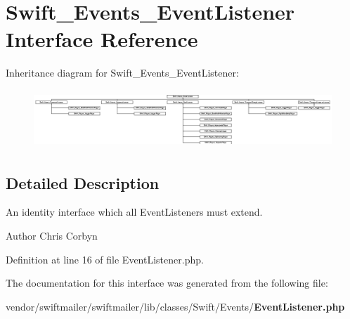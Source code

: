 \section{Swift\+\_\+\+Events\+\_\+\+Event\+Listener Interface Reference}
\label{interface_swift___events___event_listener}
Inheritance diagram for Swift\+\_\+\+Events\+\_\+\+Event\+Listener\+:\begin{figure}[H]
\begin{center}
\leavevmode
\includegraphics[height=2.213439cm]{interface_swift___events___event_listener}
\end{center}
\end{figure}


\subsection{Detailed Description}
An identity interface which all Event\+Listeners must extend.

\begin{DoxyAuthor}{Author}
Chris Corbyn 
\end{DoxyAuthor}


Definition at line 16 of file Event\+Listener.\+php.



The documentation for this interface was generated from the following file\+:\begin{DoxyCompactItemize}
\item 
vendor/swiftmailer/swiftmailer/lib/classes/\+Swift/\+Events/{\bf Event\+Listener.\+php}\end{DoxyCompactItemize}
